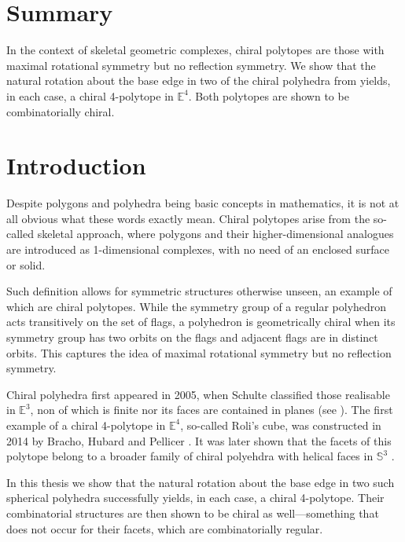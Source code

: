 \documentclass{article}
\theoremstyle{definition}
\newcommand{\E}{\mathbb{E}}
\begin{document}
	
	\section*{Summary}
	In the context of skeletal geometric complexes, chiral polytopes are those with maximal rotational symmetry but no reflection symmetry. We show that the natural rotation about the base edge in two of the chiral polyhedra from \cite{petcox} yields, in each case, a chiral 4-polytope in $\E^4$. Both polytopes are shown to be combinatorially chiral.
	
	\vspace{1cm}
		\tableofcontents
		\clearpage
	\section{Introduction}
	Despite polygons and polyhedra being basic concepts in mathematics,
	 it is not at all obvious what these words exactly mean. Chiral polytopes arise from the so-called skeletal approach, where polygons and their higher-dimensional analogues are introduced as 1-dimensional complexes, with no need of an enclosed surface or solid.
	
	Such definition allows for symmetric structures otherwise unseen, an example of which are chiral polytopes. While the symmetry group of a regular polyhedron acts transitively on the set of flags, a polyhedron is geometrically chiral when its symmetry group has two orbits on the flags and adjacent flags are in distinct orbits. This captures the idea of maximal rotational symmetry but no reflection symmetry.
	
	Chiral polyhedra first appeared in 2005, when Schulte classified those realisable in $\E^3$, non of which is finite nor its faces are contained in planes (see \cite{chiral-polyhedra-i,chiral-polyhedra-ii}). The first example of a chiral 4-polytope in $\E^4$, so-called Roli's cube, was constructed in 2014 by Bracho, Hubard and Pellicer \cite{rolis-cube}. It was later shown that the facets of this polytope belong to a broader family of chiral polyehdra with helical faces in $\mathbb{S}^3$ \cite{petcox}.
	
	In this thesis we show that the natural rotation about the base edge in two such spherical polyhedra successfully yields, in each case, a chiral 4-polytope. Their combinatorial structures are then shown to be chiral as well---something that does not occur for their facets, which are combinatorially regular.
	
\end{document}
